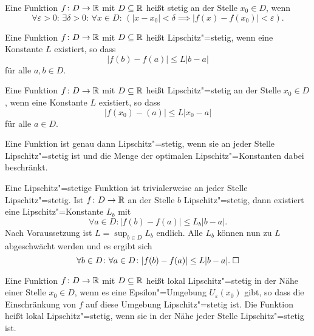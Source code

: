 \begin{Definition}%
\label{cont}\newlinefirst
Eine Funktion $f\colon D\to\mathbb R$ mit $D\subseteq\mathbb R$ heißt stetig an der
Stelle $x_0\in D$, wenn
\[\forall \varepsilon{>}0\colon\,\exists \delta{>}0\colon\,\forall x{\in}D\colon\,
(|x-x_0|<\delta\implies |f(x)-f(x_0)|<\varepsilon).\]
\end{Definition}

\begin{Definition}%
\newlinefirst
Eine Funktion $f\colon D\to\mathbb R$ mit $D\subseteq\mathbb R$ heißt
Lipschitz"=stetig, wenn eine Konstante $L$ existiert, so dass
\[|f(b)-f(a)|\le L|b-a|\]
für alle $a,b\in D$.
\end{Definition}

\begin{Definition}%
\label{Lipschitz-cont-at}\newlinefirst
Eine Funktion $f\colon D\to\mathbb R$ mit $D\subseteq\mathbb R$ heißt
Lipschitz"=stetig an der Stelle $x_0\in D$, wenn eine Konstante $L$
existiert, so dass
\[|f(x_0)-(a)|\le L|x_0-a|\]
für alle $a\in D$.
\end{Definition}

\begin{Satz}
Eine Funktion ist genau dann Lipschitz"=stetig, wenn sie an jeder
Stelle Lipschitz"=stetig ist und die Menge der optimalen
Lipschitz"=Konstanten dabei beschränkt.
\end{Satz}
\begin{Beweis}
Eine Lipschitz"=stetige Funktion ist trivialerweise an jeder Stelle
Lipschitz"=stetig. Ist $f\colon D\to\mathbb R$ an der Stelle $b$ Lipschitz"=stetig,
dann existiert eine Lipschitz"=Konstante $L_b$ mit%
\[\forall a\in D\colon |f(b)-f(a)|\le L_b |b-a|.\]
Nach Voraussetzung ist $L=\sup_{b\in D} L_b$ endlich. Alle $L_b$ können
nun zu $L$ abgeschwächt werden und es ergibt sich%
\[\forall b\in D\colon\forall a\in D\colon |f(b)-f(a)|\le L|b-a|.\;\square\]
\end{Beweis}


\begin{Definition}\newlinefirst
Eine Funktion $f\colon D\to\mathbb R$ mit $D\subseteq\mathbb R$ heißt lokal
Lipschitz"=stetig in der Nähe einer Stelle $x_0\in D$, wenn es eine
Epsilon"=Umgebung $U_\varepsilon(x_0)$ gibt, so dass die Einschränkung
von $f$ auf diese Umgebung Lipschitz"=stetig ist. Die Funktion heißt
lokal Lipschitz"=stetig, wenn sie in der Nähe jeder Stelle
Lipschitz"=stetig ist.
\end{Definition}

